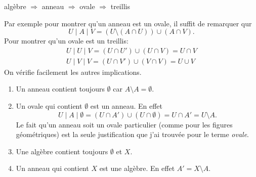 \begin{prop}
  algèbre $\Rightarrow$ anneau $\Rightarrow$ ovale $\Rightarrow$ treillis
\end{prop}
\begin{demo}
Par exemple pour montrer qu'un anneau est un ovale, il suffit de remarquer qur 
\begin{displaymath}
  U \mid A \mid V = (U \setminus (A \cap U)) \cup (A \cap V).
\end{displaymath}
Pour montrer qu'un ovale est un treillis:
\begin{align*}
  U \mid U \mid V = (U \cap U') \cup (U \cap V) = U \cap V \\
  U \mid V \mid V = (U \cap V') \cup (V \cap V) = U \cup V
\end{align*}
On vérifie facilement les autres implications.
\end{demo}

\begin{rems}
 \begin{enumerate}
  \item Un anneau contient toujours $\emptyset$ car $A \setminus A = \emptyset$.
  \item Un ovale qui contient $\emptyset$ est un anneau. En effet
    \begin{displaymath}
      U \mid A \mid \emptyset = (U \cap A')\cup (U \cap \emptyset) = U \cap A' = U \setminus A.
    \end{displaymath}
    Le fait qu'un anneau soit un ovale particulier (comme pour les figures géométriques) est la seule justification que j'ai trouvée pour le terme \emph{ovale}.
  \item Une algèbre contient toujours $\emptyset$ et $X$.
  \item Un anneau qui contient $X$ est une algèbre. En effet $A' = X \setminus A$.
 \end{enumerate}
\end{rems}

